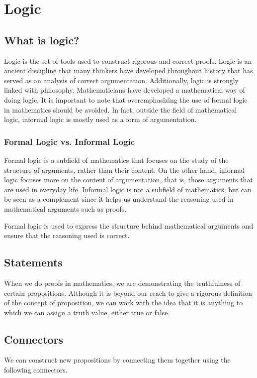 \documentclass{report}
\begin{document}
    \tableofcontents

    \pagebreak
    \chapter{ Logic }
    \section{What is logic?}
    Logic is the set of tools used to construct rigorous and correct proofs. Logic is an ancient discipline that many thinkers have developed throughout history that has served as an analysis of correct argumentation. Additionally, logic is strongly linked with philosophy. Mathematicians have developed a mathematical way of doing logic. It is important to note that overemphasizing the use of formal logic in mathematics should be avoided. In fact, outside the field of mathematical logic, informal logic is mostly used as a form of argumentation.

    \subsection{Formal Logic vs. Informal Logic}
        Formal logic is a subfield of mathematics that focuses on the study of the structure of arguments, rather than their content. On the other hand, informal logic focuses more on the content of argumentation, that is, those arguments that are used in everyday life. Informal logic is not a subfield of mathematics, but can be seen as a complement since it helps us understand the reasoning used in mathematical arguments such as proofs.

        Formal logic is used to express the structure behind mathematical arguments and ensure that the reasoning used is correct.

\section{Statements}
    When we do proofs in mathematics, we are demonstrating the truthfulness of certain propositions. Although it is beyond our reach to give a rigorous definition of the concept of proposition, we can work with the idea that it is anything to which we can assign a truth value, either true or false.

\section{Connectors}
    We can construct new propositions by connecting them together using the following connectors.
\end{document}
